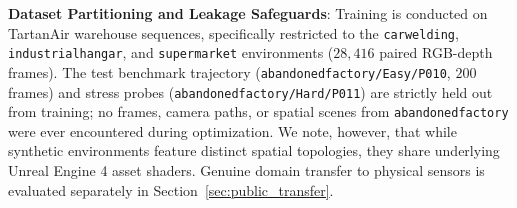 \noindent\textbf{Dataset Partitioning and Leakage Safeguards}: 
Training is conducted on TartanAir warehouse sequences, specifically restricted to the \texttt{carwelding}, \texttt{industrialhangar}, and \texttt{supermarket} environments ($28{,}416$ paired RGB-depth frames). The test benchmark trajectory (\texttt{abandonedfactory/Easy/P010}, $200$ frames) and stress probes (\texttt{abandonedfactory/Hard/P011}) are strictly held out from training; no frames, camera paths, or spatial scenes from \texttt{abandonedfactory} were ever encountered during optimization. We note, however, that while synthetic environments feature distinct spatial topologies, they share underlying Unreal Engine 4 asset shaders. Genuine domain transfer to physical sensors is evaluated separately in Section~\ref{sec:public_transfer}.


